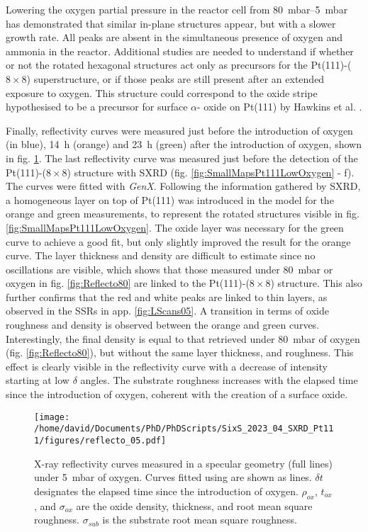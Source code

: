 Lowering the oxygen partial pressure in the reactor cell from \qtyrange{80}{5}{\milli\bar} has demonstrated that similar in-plane structures appear, but with a slower growth rate.
All peaks are absent in the simultaneous presence of oxygen and ammonia in the reactor.
Additional studies are needed to understand if whether or not the rotated hexagonal structures act only as precursors for the Pt(111)-($8\times8$) superstructure, or if those peaks are still present after an extended exposure to oxygen.
This structure could correspond to the oxide stripe hypothesised to be a precursor for surface $\alpha$- oxide on Pt(111) by Hawkins et al. \parencite*{Hawkins2009}.

Finally, reflectivity curves were measured just before the introduction of oxygen (in blue), \qty{14}{\hour} (orange) and \qty{23}{\hour} (green) after the introduction of oxygen, shown in fig. \ref{fig:Reflecto5}.
The last reflectivity curve was measured just before the detection of the Pt(111)-($8\times8$) structure with SXRD (fig. \ref{fig:SmallMapsPt111LowOxygen} - f).
The curves were fitted with \textit{GenX}.
Following the information gathered by SXRD, a homogeneous layer on top of Pt(111) was introduced in the model for the orange and green measurements, to represent the rotated structures visible in fig. \ref{fig:SmallMapsPt111LowOxygen}.
The oxide layer was necessary for the green curve to achieve a good fit, but only slightly improved the result for the orange curve.
The layer thickness and density are difficult to estimate since no oscillations are visible, which shows that those measured under \qty{80}{\milli\bar} or oxygen in fig. \ref{fig:Reflecto80} are linked to the Pt(111)-($8\times8$) structure.
This also further confirms that the red and white peaks are linked to thin layers, as observed in the SSRs in app. \ref{fig:LScans05}.
A transition in terms of oxide roughness and density is observed between the orange and green curves.
Interestingly, the final density is equal to that retrieved under \qty{80}{\milli\bar} of oxygen (fig. \ref{fig:Reflecto80}), but without the same layer thickness, and roughness.
This effect is clearly visible in the reflectivity curve with a decrease of intensity starting at low $\delta$ angles.
The substrate roughness increases with the elapsed time since the introduction of oxygen, coherent with the creation of a surface oxide.

\begin{figure}[!htb]
    \centering
    \texttt{[image: /home/david/Documents/PhD/PhDScripts/SixS\_2023\_04\_SXRD\_Pt111/figures/reflecto\_05.pdf]}
    \caption{
    	X-ray reflectivity curves measured in a specular geometry (full lines) under \qty{5}{\milli\bar} of oxygen.
        Curves fitted using  are shown as lines.
        $\delta t$ designates the elapsed time since the introduction of oxygen.
        $\rho_{ox}$, $t_{ox}$, and $\sigma_{ox}$ are the oxide density, thickness, and root mean square roughness.
        $\sigma_{sub}$ is the substrate root mean square roughness.
    }
    \label{fig:Reflecto5}
\end{figure}

